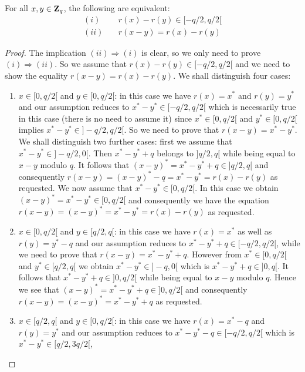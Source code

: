 \documentclass{article}
\newcommand{\zq}{\mbox{${\bf Z}_{q}$}}
\begin{document}
\begin{prop}\label{carry:signed:sub:morphism}
  For all $x,y\in\zq$, the following are equivalent:
    \begin{eqnarray*}
      (i)&\ &r(x)-r(y)\in[-q/2,q/2[\\
      (ii)&\ &r(x-y)=r(x)-r(y)
    \end{eqnarray*}
\end{prop}
\begin{proof}
  The implication $(ii)\Rightarrow(i)$ is clear, so we only need to prove
  $(i)\Rightarrow(ii)$. So we assume that $r(x)-r(y)\in[-q/2,q/2[$ and
  we need to show the equality $r(x-y)=r(x)-r(y)$. We shall distinguish
  four cases:
  \begin{enumerate}
    \item $x\in[0,q/2[$ and $y\in[0,q/2[$: in this case we have $r(x)=x^{*}$
      and $r(y)=y^{*}$ and our assumption reduces to $x^{*}-y^{*}\in[-q/2,q/2[$
      which is necessarily true in this case (there is no need to assume it)
      since $x^{*}\in[0,q/2[$ and $y^{*}\in[0,q/2[$ implies 
      $x^{*}-y^{*}\in]-q/2, q/2[$. So we need to prove that 
      $r(x-y)=x^{*}-y^{*}$. We shall distinguish two further cases:
      first we assume that $x^{*}-y^{*}\in]-q/2,0[$. Then $x^{*}-y^{*}+q$
      belongs to $]q/2,q[$ while being equal to $x-y$ modulo $q$.
      It follows that $(x-y)^{*}=x^{*}-y^{*}+q\in]q/2,q[$ and
      consequently $r(x-y) = (x-y)^{*} - q = x^{*}-y^{*}=r(x)-r(y)$
      as requested. We now assume that $x^{*}-y^{*}\in[0,q/2[$. In 
      this case we obtain $(x-y)^{*}=x^{*}-y^{*}\in[0,q/2[$ and
      consequently we have the equation 
      $r(x-y)=(x-y)^{*}=x^{*}-y^{*}=r(x)-r(y)$ as requested.
    \item $x\in[0,q/2[$ and $y\in[q/2,q[$: in this case we have $r(x)=x^{*}$
      as well as $r(y)=y^{*}-q$ and our assumption reduces to 
      $x^{*}-y^{*}+q\in[-q/2,q/2[$, while we need to prove that 
      $r(x-y)=x^{*}-y^{*}+q$. However from $x^{*}\in[0,q/2[$ and 
      $y^{*}\in[q/2,q[$ we obtain $x^{*}-y^{*}\in]-q,0[$ which is
      $x^{*}-y^{*}+q\in]0,q[$. It follows that $x^{*}-y^{*}+q\in]0,q/2[$
      while being equal to $x-y$ modulo $q$. Hence we see that 
      $(x-y)^{*}=x^{*}-y^{*}+q\in]0,q/2[$ and consequently 
      $r(x-y) = (x-y)^{*}=x^{*}-y^{*}+q$ as requested.
    \item $x\in[q/2,q[$ and $y\in[0,q/2[$: in this case we have 
      $r(x)=x^{*}-q$ and $r(y)=y^{*}$ and our assumption reduces to
      $x^{*}-y^{*}-q\in[-q/2,q/2[$ which is $x^{*}-y^{*}\in[q/2,3q/2[$, 

\end{enumerate}
\end{proof}
\end{document}
